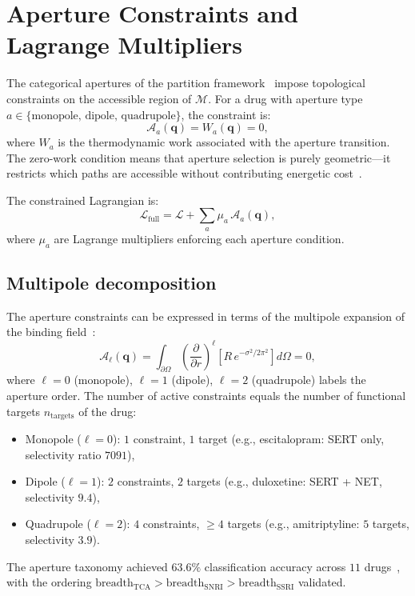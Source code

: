 \documentclass[twocolumn,aps,prl,superscriptaddress,floatfix]{revtex4-2}
\newcommand{\Lag}{\mathcal{L}}
\newcommand{\qvec}{\mathbf{q}}
\begin{document}
\section{Aperture Constraints and Lagrange Multipliers}
\label{sec:apertures}

The categorical apertures of the partition framework~\cite{sachikonye2026aperture} impose topological constraints on the accessible region of $\mathcal{M}$.
For a drug with aperture type $a \in \{\text{monopole, dipole, quadrupole}\}$, the constraint is:
\begin{equation}
\mathcal{A}_a(\qvec) = W_a(\qvec) = 0,
\label{eq:aperture_constraint}
\end{equation}
where $W_a$ is the thermodynamic work associated with the aperture transition.
The zero-work condition means that aperture selection is purely geometric---it restricts which paths are accessible without contributing energetic cost~\cite{sachikonye2026aperture}.

The constrained Lagrangian is:
\begin{equation}
\Lag_{\mathrm{full}} = \Lag + \sum_a \mu_a\,\mathcal{A}_a(\qvec),
\label{eq:constrained_lagrangian}
\end{equation}
where $\mu_a$ are Lagrange multipliers enforcing each aperture condition.

\subsection{Multipole decomposition}

The aperture constraints can be expressed in terms of the multipole expansion of the binding field~\cite{sachikonye2026aperture}:
\begin{equation}
\mathcal{A}_\ell(\qvec) = \int_{\partial\Omega} \left(\frac{\partial}{\partial r}\right)^\ell\!\!\left[R\,e^{-\sigma^2/2\pi^2}\right] d\Omega = 0,
\end{equation}
where $\ell = 0$ (monopole), $\ell = 1$ (dipole), $\ell = 2$ (quadrupole) labels the aperture order.
The number of active constraints equals the number of functional targets $n_{\mathrm{targets}}$ of the drug:
\begin{itemize}
    \item Monopole ($\ell = 0$): $1$ constraint, $1$ target (e.g., escitalopram: SERT only, selectivity ratio $7091$),
    \item Dipole ($\ell = 1$): $2$ constraints, $2$ targets (e.g., duloxetine: SERT + NET, selectivity $9.4$),
    \item Quadrupole ($\ell = 2$): $4$ constraints, $\geq 4$ targets (e.g., amitriptyline: $5$ targets, selectivity $3.9$).
\end{itemize}
The aperture taxonomy achieved $63.6\%$ classification accuracy across $11$ drugs~\cite{sachikonye2026aperture}, with the ordering $\text{breadth}_{\mathrm{TCA}} > \text{breadth}_{\mathrm{SNRI}} > \text{breadth}_{\mathrm{SSRI}}$ validated.
\end{document}

